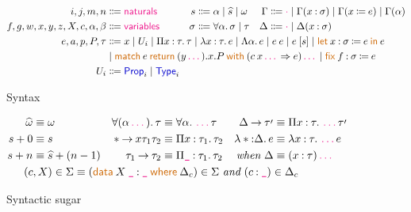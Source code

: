 \documentclass{article}
\title{}
\author{Jonathan Chan}
\newcommand{\meta}[1]{\mathsf{\textcolor{metacolour}{#1}}}
\newcommand{\ind}[1]{\mathsf{\textcolor{indcolour}{#1}}}
\newcommand{\kw}[1]{\mathsf{\textcolor{kwcolour}{#1}}}
\newcommand{\kwopen}[1]{\kw{#1}\:}
\newcommand{\kwbin}[1]{\:\kw{#1}\:}
\newcommand{\pr}[1]{\raisebox{-#1pt}{$^\prime$}}
\newcommand{\taupr}{\tau\pr{2}}
\newcommand{\poly}[2]{\forall #1 \mathpunct{.} #2}
\newcommand{\suc}[1]{\widehat{#1}}
\newcommand{\fun}[3]{\Pi #1 \mathbin{:} #2 \mathpunct{.} #3}
\newcommand{\arr}[2]{#1 \mathbin{\rightarrow} #2}
\newcommand{\lam}[3]{\lambda #1 \mathbin{:} #2 \mathpunct{.} #3}
\newcommand{\Lam}[2]{\Lambda #1 \mathpunct{.} #2}
\newcommand{\app}[2]{#1 \: #2}
\newcommand{\App}[2]{#1 \: \mathopen{[} #2 \mathclose{]}}
\newcommand{\letin}[4]{\kwopen{let} \mathopen{} #1 \mathbin{:} #2 \mathbin{\coloneqq} #3 \kwbin{in} #4}
\newcommand{\Type}[1]{\ind{Type}_{#1}}
\newcommand{\Prop}[1]{\ind{Prop}_{#1}}
\newcommand{\match}[3]{\kwopen{match} #1 \kwbin{return} #2 \kwbin{with} #3}
\newcommand{\fix}[3]{\kwopen{fix} #1 \mathbin{:} #2 \mathbin{\coloneqq} #3}
\newcommand{\data}[3]{\kwopen{data} #1 \mathbin{:} #2 \kwbin{where} #3}
\newcommand{\annot}[2]{#1 \mathbin{:} #2}
\newcommand{\define}[2]{#1 \mathbin{\coloneqq} #2}
\newcommand{\nil}{\meta{\cdot}}
\newcommand{\seq}{\,\meta{\dots}\,}
\newcommand{\any}{\meta{\texttt{\_}}}
\begin{document}
\maketitle

\begin{figure}[h]
    \centering
    \begin{align*}
        i, j, m, n &\Coloneqq \meta{naturals}
        & s &\Coloneqq \alpha \mid \suc{s} \mid \omega 
        & \Gamma &\Coloneqq \nil \mid \Gamma(\annot{x}{\sigma}) \mid \Gamma(\define{x}{e}) \mid \Gamma(\alpha) \\
        f, g, w, x, y, z, X, c, \alpha, \beta &\Coloneqq \meta{variables}
        & \sigma &\Coloneqq \poly{\alpha}{\sigma} \mid \tau
        & \Delta &\Coloneqq \nil \mid \Delta(\annot{x}{\sigma}) \\
        e, a, p, P, \tau &\Coloneqq \mathrlap{x \mid U_{i} \mid \fun{x}{\tau}{\tau} \mid \lam{x}{\tau}{e} \mid \Lam{\alpha}{e} \mid \app{e}{e} \mid \App{e}{s} \mid \letin{x}{\sigma}{e}{e}} \\
        &\mid \mathrlap{\match{e}{(y \seq).x.P}{(\app{c}{x \seq} \Rightarrow e) \seq} \mid \fix{f}{\sigma}{e}} \\
        U_i &\Coloneqq \Prop{i} \mid \Type{i}
    \end{align*}
    \caption{Syntax}
    \label{fig:syntax}
\end{figure}

\begin{figure}[h]
    \centering
    \begin{align*}
        \suc{\omega} &\equiv \omega
        & \poly{(\alpha \seq)}{\tau} &\equiv \poly{\alpha}{\seq \tau}
        & \arr{\Delta}{\taupr} &\equiv \fun{x}{\tau}{\seq \taupr} \\
        s + 0 &\equiv s
        & \arr*{x}{\tau_1}{\tau_2} &\equiv \fun{x}{\tau_1}{\tau_2}
        & \lam*{\Delta}{e} &\equiv \lam{x}{\tau}{\seq e} \\
        s + n &\equiv \suc{s} + (n - 1)
        & \arr{\tau_1}{\tau_2} &\equiv \fun{\any}{\tau_1}{\tau_2}
        & \textit{when} ~ \Delta &\equiv (\annot{x}{\tau}) \seq \\
        &&\mathclap{(c, X) \in \Sigma \equiv (\data{\app{X}{\any}}{\any}{\Delta_c}) \in \Sigma ~ \textit{and} ~ (\annot{c}{\any}) \in \Delta_c}
    \end{align*}
    \caption{Syntactic sugar}
    \label{fig:sugar}
\end{figure}
\end{document}
